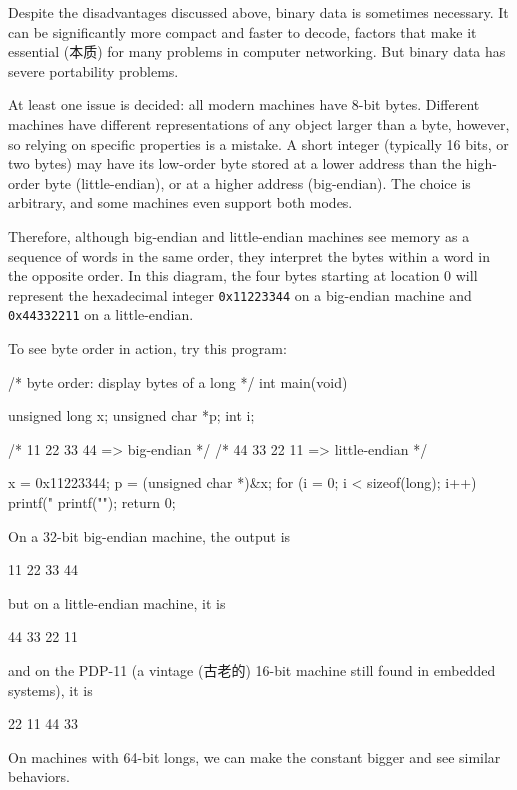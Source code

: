 Despite the disadvantages discussed above, binary data is sometimes
necessary. It can be significantly more compact and faster to decode,
factors that make it essential (本质) for many problems in computer
networking. But binary data has severe portability problems.

At least one issue is decided: all modern machines have 8-bit bytes.
Different machines have different representations of any object larger than
a byte, however, so relying on specific properties is a mistake. A short
integer (typically 16 bits, or two bytes) may have its low-order byte
stored at a lower address than the high-order byte (little-endian), or at a
higher address (big-endian). The choice is arbitrary, and some machines
even support both modes.

Therefore, although big-endian and little-endian machines see memory as a
sequence of words in the same order, they interpret the bytes within a word
in the opposite order.  In this diagram, the four bytes starting at
location 0 will represent the hexadecimal integer \verb'0x11223344' on a
big-endian machine and \verb'0x44332211' on a little-endian.
\begin{figure}[h]
    \centering
\end{figure}

To see byte order in action, try this program:
\begin{wellcode}
    /* byte order: display bytes of a long */
    int main(void)
    {
        unsigned long x;
        unsigned char *p;
        int i;

        /* 11 22 33 44 => big-endian */
        /* 44 33 22 11 => little-endian */

        x = 0x11223344;
        p = (unsigned char *)&x;
        for (i = 0; i < sizeof(long); i++)
            printf("%
        printf("\n");
        return 0;
    }
\end{wellcode}
On a 32-bit big-endian machine, the output is
\begin{wellcode}
    11 22 33 44
\end{wellcode}
but on a little-endian machine, it is
\begin{wellcode}
    44 33 22 11
\end{wellcode}
and on the PDP-11 (a vintage (古老的) 16-bit machine still found in
embedded systems), it is
\begin{wellcode}
    22 11 44 33
\end{wellcode}
On machines with 64-bit longs, we can make the constant bigger and see
similar behaviors.

